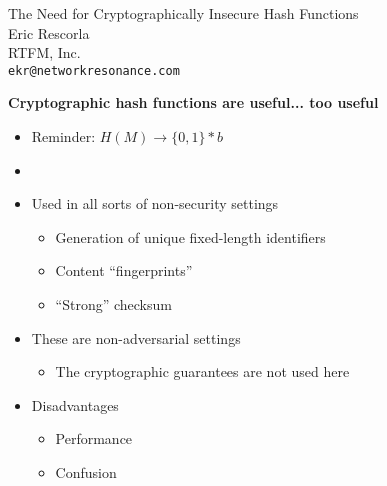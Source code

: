 \documentclass[helvetica]{seminar}
\newcommand{\heading}[1]{%
  \begin{center} 
    \large\bf 
    #1 
  \end{center} 
  \vspace{.4 in}}
\begin{document}
        
\begin{slide}
\begin{center}
\LARGE{{\bf}The Need for Cryptographically Insecure Hash Functions}\\

\vspace{.3 in}
\large{Eric Rescorla}\\
\large{RTFM, Inc.}\\
\large{\texttt{ekr@networkresonance.com}}
\end{center}
\end{slide}


\begin{slide}
\heading{Cryptographic hash functions are useful... too useful}

\begin{itemize}
\item Reminder: $H(M) \to \{0,1\}*b$
\item[]
\item Used in all sorts of non-security settings
\begin{itemize}
\item Generation of unique fixed-length identifiers~\cite{reload}
\item Content ``fingerprints''~\cite{rfc4366,fork-loop-fix}
\item ``Strong'' checksum~\cite{http}
\end{itemize}
\item These are non-adversarial settings
\begin{itemize}
\item The cryptographic guarantees are not used here
\end{itemize}
\item Disadvantages
\begin{itemize}
\item Performance
\item Confusion
\end{itemize}
\end{itemize}
\end{slide}
\end{document}
